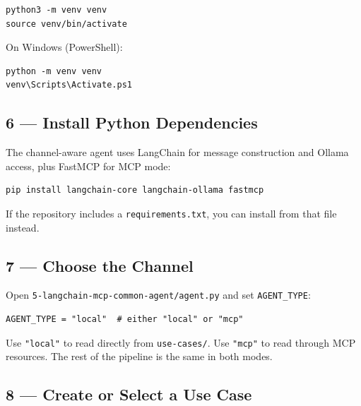 \documentclass[12pt, a4paper]{article}
\begin{document}
\begin{lstlisting}[style=shellstyle]
python3 -m venv venv
source venv/bin/activate
\end{lstlisting}

On Windows (PowerShell):

\begin{lstlisting}[style=shellstyle]
python -m venv venv
venv\Scripts\Activate.ps1
\end{lstlisting}

\subsection{6 --- Install Python Dependencies}

The channel-aware agent uses LangChain for message construction and Ollama access, plus FastMCP for MCP mode:

\begin{lstlisting}[style=shellstyle]
pip install langchain-core langchain-ollama fastmcp
\end{lstlisting}

If the repository includes a \texttt{requirements.txt}, you can install from that file instead.

\subsection{7 --- Choose the Channel}

Open \texttt{5-langchain-mcp-common-agent/agent.py} and set \texttt{AGENT\_TYPE}:

\begin{lstlisting}[style=pythonstyle]
AGENT_TYPE = "local"  # either "local" or "mcp"
\end{lstlisting}

Use \texttt{"local"} to read directly from \texttt{use-cases/}. Use \texttt{"mcp"} to read through MCP resources. The rest of the pipeline is the same in both modes.

\subsection{8 --- Create or Select a Use Case}
\end{document}

